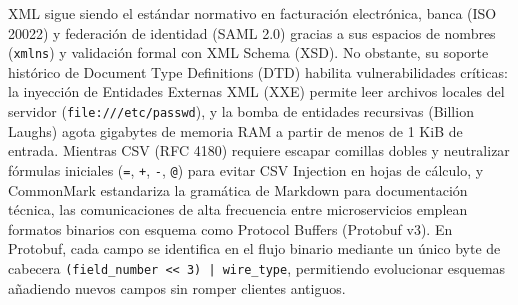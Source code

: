 \documentclass{book}
\begin{document}
XML sigue siendo el estándar normativo en facturación electrónica, banca (ISO 20022) y federación de identidad (SAML 2.0) gracias a sus espacios de nombres (\texttt{xmlns}) y validación formal con XML Schema (XSD). No obstante, su soporte histórico de Document Type Definitions (DTD) habilita vulnerabilidades críticas: la inyección de Entidades Externas XML (XXE) permite leer archivos locales del servidor (\texttt{file:///etc/passwd}), y la bomba de entidades recursivas (Billion Laughs) agota gigabytes de memoria RAM a partir de menos de 1 KiB de entrada.
Mientras CSV (RFC 4180) requiere escapar comillas dobles y neutralizar fórmulas iniciales (\texttt{=}, \texttt{+}, \texttt{-}, \texttt{@}) para evitar CSV Injection en hojas de cálculo, y CommonMark estandariza la gramática de Markdown para documentación técnica, las comunicaciones de alta frecuencia entre microservicios emplean formatos binarios con esquema como Protocol Buffers (Protobuf v3). En Protobuf, cada campo se identifica en el flujo binario mediante un único byte de cabecera \texttt{(field\_number << 3) | wire\_type}, permitiendo evolucionar esquemas añadiendo nuevos campos sin romper clientes antiguos.
\end{document}

